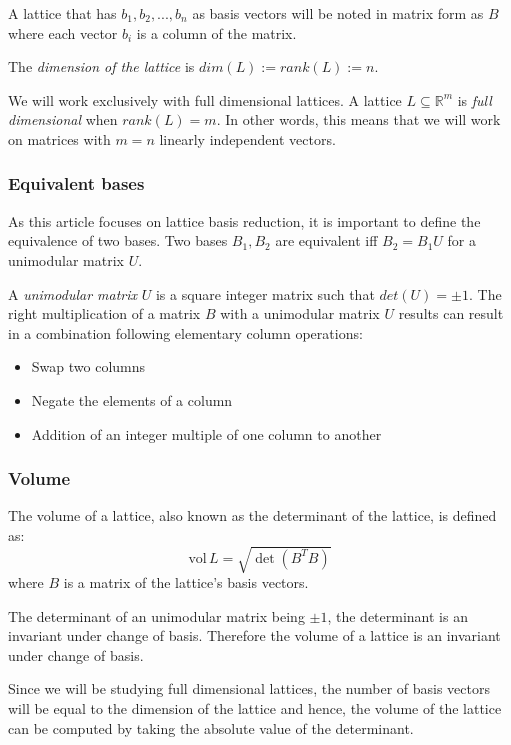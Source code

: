 \documentclass[10pt]{article}
\begin{document}
A lattice that has $b_1,b_2,...,b_n$ as basis vectors will be noted in matrix form as $B$ where each vector $b_i$ is a column of the matrix.

The \emph{dimension of the lattice} is $dim(L) := rank(L) := n$. 

We will work exclusively with full dimensional lattices. A lattice $L \subseteq \mathbb{R}^m$ is \emph{full dimensional} when $rank(L)=m$. In other words, this means that we will work on matrices with $m=n$ linearly independent vectors.

\subsubsection{Equivalent bases}

As this article focuses on lattice basis reduction, it is important to define the equivalence of two bases. Two bases $B_1 , B_2$ are equivalent iff $B_2 = B_1 U$ for a unimodular matrix $U$.

A \emph{unimodular matrix} $U$ is a square integer matrix such that $det(U) = \pm 1$. The right multiplication of a matrix $B$ with a unimodular matrix $U$ results can result in a combination following elementary column operations:
\begin{itemize}
\item Swap two columns
\item Negate the elements of a column
\item Addition of an integer multiple of one column to another
\end{itemize}

\subsubsection{Volume}

The volume of a lattice, also known as the determinant of the lattice, is defined as:
\[
\text{vol} \,L = \sqrt{\det(B^T B)}
\] where $B$ is a matrix of the lattice's basis vectors.


The determinant of an unimodular matrix being $\pm 1$, the determinant is an invariant under change of basis. Therefore the volume of a lattice is an invariant under change of basis.

Since we will be studying full dimensional lattices, the number of basis vectors will be equal to the dimension of the lattice and hence, the volume of the lattice can be computed by taking the absolute value of the determinant.
\end{document}
